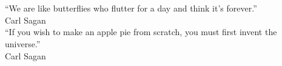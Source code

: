 \chapter*{}
\vfill
\begin{flushright}
  ``We are like butterflies who flutter for a day and think it's forever.'' \\
 Carl Sagan \\
``If you wish to make an apple pie from scratch, you must first invent the
universe.'' \\
 Carl Sagan \\
\end{flushright}
